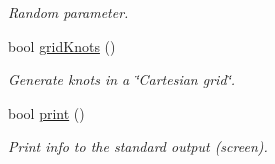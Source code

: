 \begin{CompactItemize}
\begin{CompactList}\small\item\em Random parameter. \item\end{CompactList}\item 
bool \hyperlink{classOVRectangleKnots_202185a7b2c2aba07205bdd996e572c2}{gridKnots} ()
\begin{CompactList}\small\item\em Generate knots in a \char`\"{}Cartesian grid\char`\"{}. \item\end{CompactList}\item 
\hypertarget{classOVRectangleKnots_33623eb50ee41ced6722e78110941588}{
bool \hyperlink{classOVRectangleKnots_33623eb50ee41ced6722e78110941588}{print} ()}
\label{classOVRectangleKnots_33623eb50ee41ced6722e78110941588}

\begin{CompactList}\small\item\em Print info to the standard output (screen). \item\end{CompactList}\end{CompactItemize}
